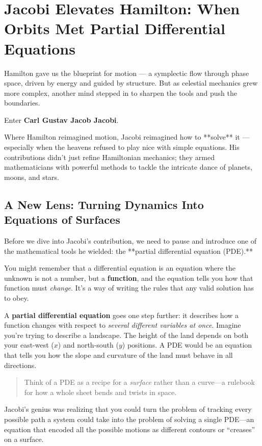 \section{Jacobi Elevates Hamilton: When Orbits Met Partial Differential Equations}

Hamilton gave us the blueprint for motion — a symplectic flow through phase space, driven by energy and guided by structure. But as celestial mechanics grew more complex, another mind stepped in to sharpen the tools and push the boundaries.

Enter \textbf{Carl Gustav Jacob Jacobi}.

Where Hamilton reimagined motion, Jacobi reimagined how to **solve** it — especially when the heavens refused to play nice with simple equations. His contributions didn’t just refine Hamiltonian mechanics; they armed mathematicians with powerful methods to tackle the intricate dance of planets, moons, and stars.

\subsection{A New Lens: Turning Dynamics Into Equations of Surfaces}

Before we dive into Jacobi’s contribution, we need to pause and introduce one of the mathematical tools he wielded: the **partial differential equation (PDE).**

You might remember that a differential equation is an equation where the unknown is not a number, but a \textbf{function}, and the equation tells you how that function must \emph{change}. It’s a way of writing the rules that any valid solution has to obey.

A \textbf{partial differential equation} goes one step further: it describes how a function changes with respect to \emph{several different variables at once}. Imagine you’re trying to describe a landscape. The height of the land depends on both your east-west (\( x \)) and north-south (\( y \)) positions. A PDE would be an equation that tells you how the slope and curvature of the land must behave in all directions.

\begin{quote}
Think of a PDE as a recipe for a \textit{surface} rather than a curve—a rulebook for how a whole sheet bends and twists in space.
\end{quote}

Jacobi’s genius was realizing that you could turn the problem of tracking every possible path a system could take into the problem of solving a single PDE—an equation that encoded all the possible motions as different contours or “creases” on a surface.

